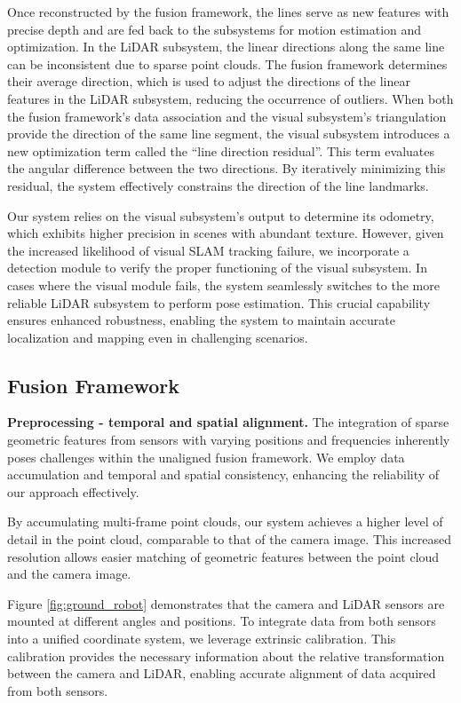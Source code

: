 Once reconstructed by the fusion framework, the lines serve as new features with precise depth and are fed back to the subsystems for motion estimation and optimization. In the LiDAR subsystem, the linear directions along the same line can be inconsistent due to sparse point clouds. 
%
The fusion framework determines their average direction, which is used to adjust the directions of the linear features in the LiDAR subsystem, reducing the occurrence of outliers. When both the fusion framework's data association and the visual subsystem's triangulation provide the direction of the same line segment, the visual subsystem introduces a new optimization term called the ``line direction residual''. This term evaluates the angular difference between the two directions. By iteratively minimizing this residual, the system effectively constrains the direction of the line landmarks.

Our system relies on the visual subsystem's output to determine its odometry, which exhibits higher precision in scenes with abundant texture. However, given the increased likelihood of visual SLAM tracking failure, we incorporate a detection module to verify the proper functioning of the visual subsystem. In cases where the visual module fails, the system seamlessly switches to the more reliable LiDAR subsystem to perform pose estimation. This crucial capability ensures enhanced robustness, enabling the system to maintain accurate localization and mapping even in challenging scenarios.

\subsection{Fusion Framework}
\noindent\textbf{Preprocessing - temporal and spatial alignment.} The integration of sparse geometric features from sensors with varying positions and frequencies inherently poses challenges within the unaligned fusion framework. We employ data accumulation and temporal and spatial consistency, enhancing the reliability of our approach effectively.

By accumulating multi-frame point clouds, our system achieves a higher level of detail in the point cloud, comparable to that of the camera image.  This increased resolution allows easier matching of geometric features between the point cloud and the camera image.

Figure \ref{fig:ground_robot} demonstrates that the camera and LiDAR sensors are mounted at different angles and positions. To integrate data from both sensors into a unified coordinate system, we leverage extrinsic calibration. This calibration provides the necessary information about the relative transformation between the camera and LiDAR, enabling accurate alignment of data acquired from both sensors.

